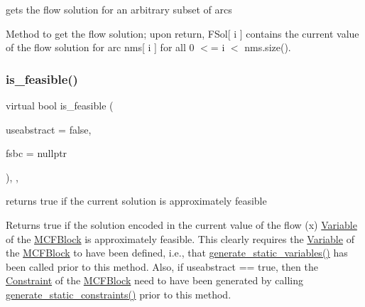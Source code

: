 gets the flow solution for an arbitrary subset of arcs 

Method to get the flow solution; upon return, F\+Sol\mbox{[} i \mbox{]} contains the current value of the flow solution for arc nms\mbox{[} i \mbox{]} for all 0 $<$= i $<$ nms.\+size(). \mbox{\label{class_s_m_spp__di__unipi__it_1_1_m_c_f_block_a162cd7d8375d705f0b15d8e847098763}} 
\subsubsection{\texorpdfstring{is\+\_\+feasible()}{is\_feasible()}}
{\footnotesize\ttfamily virtual bool is\+\_\+feasible (\begin{DoxyParamCaption}\item[{bool}]{useabstract = {\ttfamily false},  }\item[{\mbox{\hyperlink{class_s_m_spp__di__unipi__it_1_1_configuration}{Configuration}} $\ast$}]{fsbc = {\ttfamily nullptr} }\end{DoxyParamCaption})\hspace{0.3cm}{\ttfamily [final]}, {\ttfamily [override]}, {\ttfamily [virtual]}}



returns true if the current solution is approximately feasible 

Returns true if the solution encoded in the current value of the flow (x) \mbox{\hyperlink{class_s_m_spp__di__unipi__it_1_1_variable}{Variable}} of the \mbox{\hyperlink{class_s_m_spp__di__unipi__it_1_1_m_c_f_block}{M\+C\+F\+Block}} is approximately feasible. This clearly requires the \mbox{\hyperlink{class_s_m_spp__di__unipi__it_1_1_variable}{Variable}} of the \mbox{\hyperlink{class_s_m_spp__di__unipi__it_1_1_m_c_f_block}{M\+C\+F\+Block}} to have been defined, i.\+e., that \mbox{\hyperlink{class_s_m_spp__di__unipi__it_1_1_m_c_f_block_a599bd50cdc6123555aa4a6c4e22c996d}{generate\+\_\+static\+\_\+variables()}} has been called prior to this method. Also, if useabstract == true, then the \mbox{\hyperlink{class_s_m_spp__di__unipi__it_1_1_constraint}{Constraint}} of the \mbox{\hyperlink{class_s_m_spp__di__unipi__it_1_1_m_c_f_block}{M\+C\+F\+Block}} need to have been generated by calling \mbox{\hyperlink{class_s_m_spp__di__unipi__it_1_1_m_c_f_block_a33f94035590874ef8616982e11e7bb43}{generate\+\_\+static\+\_\+constraints()}} prior to this method.

